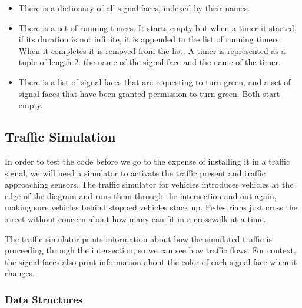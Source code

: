 \documentclass[letterpaper,twoside]{article}
\begin{document}
\begin{itemize}
\item{There is a dictionary of all signal faces, indexed by their names.}

\item{There is a set of running timers.  It starts empty but when a timer
it started, if its duration is not infinite, it is appended to the
list of running timers.  When it completes it is removed from the list.
A timer is represented as a tuple of length 2: the name of the
signal face and the name of the timer.}

\item{There is a list of signal faces that are requesting to turn green,
and a set of signal faces that have been granted permission
to turn green.  Both start empty.}

\end{itemize}

\subsection{Traffic Simulation}

In order to test the code before we go to the expense of installing
it in a traffic signal, we will need a simulator to activate the
traffic present and traffic approaching sensors.  The traffic simulator
for vehicles introduces vehicles at the edge of the diagram and
runs them through the intersection and out again, making sure vehicles
behind stopped vehicles stack up.  Pedestrians just cross the street
without concern about how many can fit in a crosswalk at a time.

The traffic simulator prints information about how the simulated
traffic is proceeding through the intersection, so we can see how
traffic flows.  For context, the signal faces also print information
about the color of each signal face when it changes.

\subsubsection{Data Structures}
\end{document}
